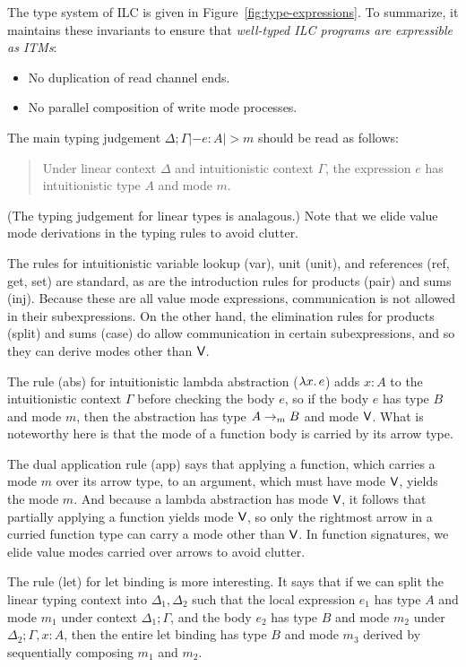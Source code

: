 The type system of ILC is given in Figure~\ref{fig:type-expressions}. To
summarize, it maintains these invariants to ensure that \emph{well-typed ILC
  programs are expressible as ITMs}:
\begin{itemize}[leftmargin=*]
  \item No duplication of read channel ends.
  \item No parallel composition of write mode processes.
\end{itemize}

The main typing judgement $\Delta ; \Gamma |- e : A |> m$ should be read as follows:
\begingroup
\addtolength\leftmargini{-.2in}
\begin{quote}
  Under linear context $\Delta$ and intuitionistic context $\Gamma$, the expression $e$
  has intuitionistic type $A$ and mode $m$.
\end{quote}
\endgroup
\noindent (The typing judgement for linear types is analagous.) Note that we
elide value mode derivations in the typing rules to avoid clutter.

The rules for intuitionistic variable lookup (var), unit (unit), and references
(ref, get, set) are standard, as are the introduction rules for products (pair)
and sums (inj). Because these are all value mode expressions, communication is
not allowed in their subexpressions. On the other hand, the elimination rules
for products (split) and sums (case) do allow communication in certain
subexpressions, and so they can derive modes other than $\textsf{V}$.

The rule (abs) for intuitionistic lambda abstraction ($\lambda{x}.\,{e}$) adds $x:A$
to the intuitionistic context $\Gamma$ before checking the body $e$, so if the body
$e$ has type $B$ and mode $m$, then the abstraction has type
${A}\rightarrow_{\footnotesize m}{B}$ and mode $\textsf{V}$. What is noteworthy here is that
the mode of a function body is carried by its arrow type.

The dual application rule (app) says that applying a function, which carries a
mode $m$ over its arrow type, to an argument, which must have mode $\textsf{V}$, yields
the mode $m$. And because a lambda abstraction has mode $\textsf{V}$, it follows that
partially applying a function yields mode $\textsf{V}$, so only the rightmost arrow in
a curried function type can carry a mode other than $\textsf{V}$. In function
signatures, we elide value modes carried over arrows to avoid clutter.

The rule (let) for let binding is more interesting. It says that if we can split
the linear typing context into $\Delta_1,\Delta_2$ such that the local expression $e_1$
has type $A$ and mode $m_1$ under context $\Delta_1; \Gamma$, and the body $e_2$ has type
$B$ and mode $m_2$ under $\Delta_2 ; \Gamma, x:A$, then the entire let binding has type
$B$ and mode $m_3$ derived by sequentially composing $m_1$ and $m_2$. 


